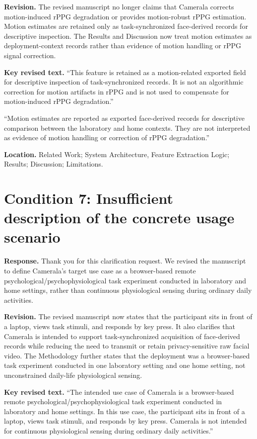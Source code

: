 \documentclass[11pt]{article}
\newcommand{\condition}[2]{\section*{Condition #1: #2}}
\begin{document}
\textbf{Revision.}
The revised manuscript no longer claims that Camerala corrects motion-induced rPPG degradation or provides motion-robust rPPG estimation.
Motion estimates are retained only as task-synchronized face-derived records for descriptive inspection.
The Results and Discussion now treat motion estimates as deployment-context records rather than evidence of motion handling or rPPG signal correction.

\textbf{Key revised text.}
``This feature is retained as a motion-related exported field for descriptive inspection of task-synchronized records. It is not an algorithmic correction for motion artifacts in rPPG and is not used to compensate for motion-induced rPPG degradation.''

``Motion estimates are reported as exported face-derived records for descriptive comparison between the laboratory and home contexts. They are not interpreted as evidence of motion handling or correction of rPPG degradation.''

\textbf{Location.}
Related Work; System Architecture, Feature Extraction Logic; Results; Discussion; Limitations.

\condition{7}{Insufficient description of the concrete usage scenario}
\textbf{Response.}
Thank you for this clarification request.
We revised the manuscript to define Camerala's target use case as a browser-based remote psychological/psychophysiological task experiment conducted in laboratory and home settings, rather than continuous physiological sensing during ordinary daily activities.

\textbf{Revision.}
The revised manuscript now states that the participant sits in front of a laptop, views task stimuli, and responds by key press.
It also clarifies that Camerala is intended to support task-synchronized acquisition of face-derived records while reducing the need to transmit or retain privacy-sensitive raw facial video.
The Methodology further states that the deployment was a browser-based task experiment conducted in one laboratory setting and one home setting, not unconstrained daily-life physiological sensing.

\textbf{Key revised text.}
``The intended use case of Camerala is a browser-based remote psychological/psychophysiological task experiment conducted in laboratory and home settings. In this use case, the participant sits in front of a laptop, views task stimuli, and responds by key press. Camerala is not intended for continuous physiological sensing during ordinary daily activities.''
\end{document}
